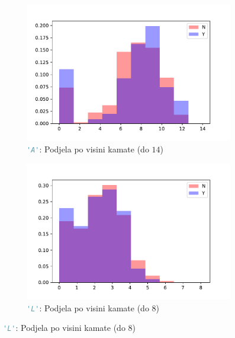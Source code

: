 \documentclass[paper = a4, fontsize = 11pt, DIV = 12, BCOR = 0pt, headings = standardclasses, numbers = endperiod]{scrartcl}
\begin{document}
\begin{figure}[htb!]
		\par

		\begin{subfigure}{0.4\textwidth}
			\centering
			\includegraphics[width = \textwidth]{kamata_A.pdf}
			\caption[{\lstinline[language = Python, style = lijepo]{'A'}: Podjela po visini kamate}]{\lstinline[language = Python, style = lijepo]{'A'}: Podjela po visini kamate (do \ensuremath{14})}
		\end{subfigure}
		\hfill
		\begin{subfigure}{0.4\textwidth}
			\centering
			\includegraphics[width = \textwidth]{kamata_L.pdf}
			\caption[{\lstinline[language = Python, style = lijepo]{'L'}: Podjela po visini kamate}]{\lstinline[language = Python, style = lijepo]{'L'}: Podjela po visini kamate (do \ensuremath{8})}
		\end{subfigure}
		
		\par
		

\end{figure}
\end{document}
